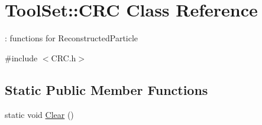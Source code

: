\hypertarget{classToolSet_1_1CRC}{
\section{ToolSet::CRC Class Reference}
\label{classToolSet_1_1CRC}
}


: functions for ReconstructedParticle  


{\ttfamily \#include $<$CRC.h$>$}\subsection*{Static Public Member Functions}
\begin{DoxyCompactItemize}
\item 
\hypertarget{classToolSet_1_1CRC_a7066dead5ad5b69ad7526a48b7b4e2e1}{
static void \hyperlink{classToolSet_1_1CRC_a7066dead5ad5b69ad7526a48b7b4e2e1}{Clear} ()}
\label{classToolSet_1_1CRC_a7066dead5ad5b69ad7526a48b7b4e2e1}


\end{DoxyCompactItemize}

